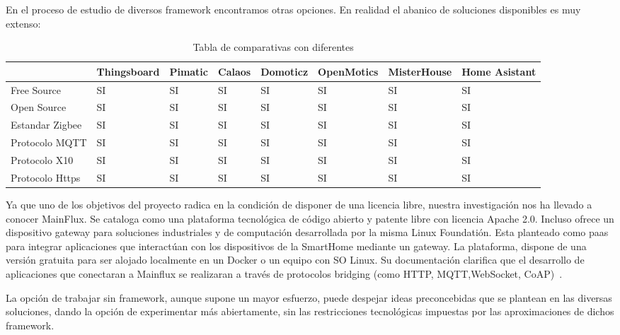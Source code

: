 \vspace{1cm}

En el proceso de estudio de diversos \gls{framework} encontramos otras opciones. En realidad el abanico de soluciones disponibles es muy extenso:

\begin{table}[hbtp]
    \begin{center}

    \begin{tabular}{|l|l|l|l|l|l|l|l|}
        \hline
        & Thingsboard & Pimatic & Calaos & Domoticz & OpenMotics  & MisterHouse & Home Asistant \\
        \hline \hline
        Free Source & SI & SI & SI & SI & SI & SI & SI\\ \hline
        Open Source & SI & SI & SI & SI & SI & SI & SI\\ \hline
        Estandar Zigbee & SI & SI & SI & SI & SI & SI & SI\\ \hline
        Protocolo MQTT & SI & SI & SI & SI & SI & SI & SI\\ \hline
        Protocolo X10 & SI & SI & SI & SI & SI & SI & SI\\ \hline
        Protocolo Https & SI & SI & SI & SI & SI & SI & SI\\ \hline
        \hline
    \end{tabular}
    \caption{Tabla de comparativas con diferentes }
    \label{table1}
   \end{center}
\end{table}


Ya que uno de los objetivos del proyecto radica en la condición de disponer de una licencia libre, nuestra investigación nos ha llevado a conocer MainFlux. Se cataloga como una plataforma tecnológica de código abierto y patente libre con licencia Apache 2.0. Incluso ofrece un dispositivo gateway para soluciones industriales y de computación desarrollada por la misma Linux Foundatión. Esta planteado como \gls{paas} para integrar aplicaciones que interactúan con los dispositivos de la SmartHome mediante un gateway. La plataforma, dispone de una versión gratuita para ser alojado localmente en un Docker o un equipo con SO Linux. Su documentación clarifica que el desarrollo de aplicaciones que conectaran a Mainflux se realizaran a través de protocolos bridging (como HTTP, MQTT,WebSocket, CoAP)~\cite{mainfluxdoc}.


La opción de trabajar sin \gls{framework}, aunque supone un mayor esfuerzo, puede despejar ideas preconcebidas que se plantean en las diversas soluciones, dando la opción de experimentar más abiertamente, sin las restricciones tecnológicas impuestas por las aproximaciones de dichos \gls{framework}.

